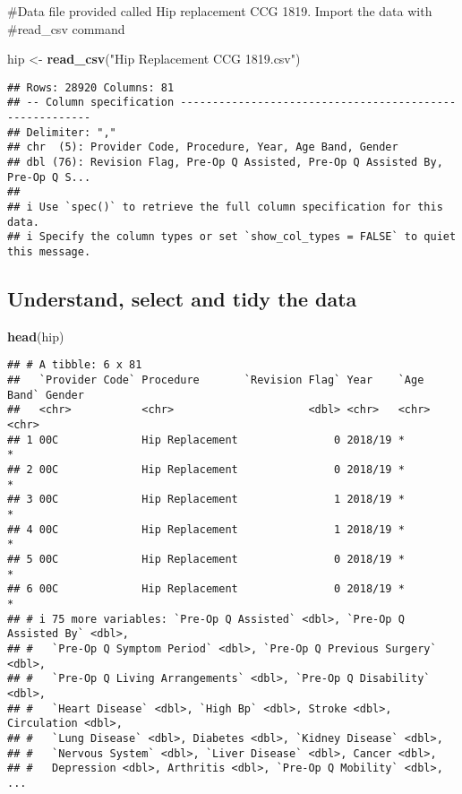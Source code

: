\documentclass[
]{article}
\newenvironment{Shaded}{\begin{snugshade}}{\end{snugshade}}
\newcommand{\FunctionTok}[1]{\textcolor[rgb]{0.13,0.29,0.53}{\textbf{#1}}}
\newcommand{\NormalTok}[1]{#1}
\newcommand{\OtherTok}[1]{\textcolor[rgb]{0.56,0.35,0.01}{#1}}
\newcommand{\StringTok}[1]{\textcolor[rgb]{0.31,0.60,0.02}{#1}}
\begin{document}
\#Data file provided called Hip replacement CCG 1819. Import the data
with \#read\_csv command

\begin{Shaded}
\begin{Highlighting}[]
\NormalTok{hip }\OtherTok{\textless{}{-}} \FunctionTok{read\_csv}\NormalTok{(}\StringTok{"Hip Replacement CCG 1819.csv"}\NormalTok{)}
\end{Highlighting}
\end{Shaded}

\begin{verbatim}
## Rows: 28920 Columns: 81
## -- Column specification --------------------------------------------------------
## Delimiter: ","
## chr  (5): Provider Code, Procedure, Year, Age Band, Gender
## dbl (76): Revision Flag, Pre-Op Q Assisted, Pre-Op Q Assisted By, Pre-Op Q S...
## 
## i Use `spec()` to retrieve the full column specification for this data.
## i Specify the column types or set `show_col_types = FALSE` to quiet this message.
\end{verbatim}

\subsection{Understand, select and tidy the
data}\label{understand-select-and-tidy-the-data}

\begin{Shaded}
\begin{Highlighting}[]
\FunctionTok{head}\NormalTok{(hip)}
\end{Highlighting}
\end{Shaded}

\begin{verbatim}
## # A tibble: 6 x 81
##   `Provider Code` Procedure       `Revision Flag` Year    `Age Band` Gender
##   <chr>           <chr>                     <dbl> <chr>   <chr>      <chr> 
## 1 00C             Hip Replacement               0 2018/19 *          *     
## 2 00C             Hip Replacement               0 2018/19 *          *     
## 3 00C             Hip Replacement               1 2018/19 *          *     
## 4 00C             Hip Replacement               1 2018/19 *          *     
## 5 00C             Hip Replacement               0 2018/19 *          *     
## 6 00C             Hip Replacement               0 2018/19 *          *     
## # i 75 more variables: `Pre-Op Q Assisted` <dbl>, `Pre-Op Q Assisted By` <dbl>,
## #   `Pre-Op Q Symptom Period` <dbl>, `Pre-Op Q Previous Surgery` <dbl>,
## #   `Pre-Op Q Living Arrangements` <dbl>, `Pre-Op Q Disability` <dbl>,
## #   `Heart Disease` <dbl>, `High Bp` <dbl>, Stroke <dbl>, Circulation <dbl>,
## #   `Lung Disease` <dbl>, Diabetes <dbl>, `Kidney Disease` <dbl>,
## #   `Nervous System` <dbl>, `Liver Disease` <dbl>, Cancer <dbl>,
## #   Depression <dbl>, Arthritis <dbl>, `Pre-Op Q Mobility` <dbl>, ...
\end{verbatim}
\end{document}
